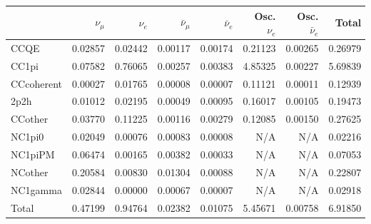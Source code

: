 \begin{tabular} { | l ||r | r | r | r | r | r | | r | }
\hline
              & $\nu_\mu$            & $\nu_e$              & $\bar{\nu}_{\mu}$    & $\bar{\nu}_{e}$      & Osc. $\nu_e$         & Osc. $\bar{\nu}_{e}$ & Total                \\ \hline\hline
 CCQE         & 0.02857              & 0.02442              & 0.00117              & 0.00174              & 0.21123              & 0.00265              & 0.26979              \\ \hline
 CC1pi        & 0.07582              & 0.76065              & 0.00257              & 0.00383              & 4.85325              & 0.00227              & 5.69839              \\ \hline
 CCcoherent   & 0.00027              & 0.01765              & 0.00008              & 0.00007              & 0.11121              & 0.00011              & 0.12939              \\ \hline
 2p2h         & 0.01012              & 0.02195              & 0.00049              & 0.00095              & 0.16017              & 0.00105              & 0.19473              \\ \hline
 CCother      & 0.03770              & 0.11225              & 0.00116              & 0.00279              & 0.12085              & 0.00150              & 0.27625              \\ \hline
 NC1pi0       & 0.02049              & 0.00076              & 0.00083              & 0.00008              & N/A                  & N/A                  & 0.02216              \\ \hline
 NC1piPM      & 0.06474              & 0.00165              & 0.00382              & 0.00033              & N/A                  & N/A                  & 0.07053              \\ \hline
 NCother      & 0.20584              & 0.00830              & 0.01304              & 0.00088              & N/A                  & N/A                  & 0.22807              \\ \hline
 NC1gamma     & 0.02844              & 0.00000              & 0.00067              & 0.00007              & N/A                  & N/A                  & 0.02918              \\ \hline
\hline
 Total        & 0.47199              & 0.94764              & 0.02382              & 0.01075              & 5.45671              & 0.00758              & 6.91850              \\ \hline

\end{tabular}
